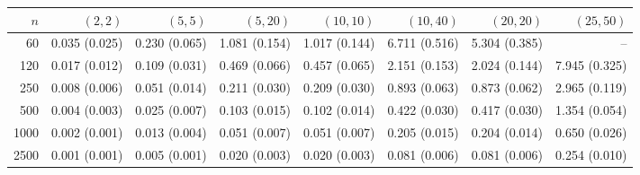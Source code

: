 \begin{tabular}{rrrrrrrr}
\toprule
$n$ & $(2,2)$ & $(5,5)$ & $(5,20)$ & $(10,10)$ & $(10,40)$ & $(20,20)$ & $(25,50)$\\
\midrule
60 & 0.035 \scriptsize(0.025) & 0.230 \scriptsize(0.065) & 1.081 \scriptsize(0.154) & 1.017 \scriptsize(0.144) & 6.711 \scriptsize(0.516) & 5.304 \scriptsize(0.385) & --\\
120 & 0.017 \scriptsize(0.012) & 0.109 \scriptsize(0.031) & 0.469 \scriptsize(0.066) & 0.457 \scriptsize(0.065) & 2.151 \scriptsize(0.153) & 2.024 \scriptsize(0.144) & 7.945 \scriptsize(0.325)\\
250 & 0.008 \scriptsize(0.006) & 0.051 \scriptsize(0.014) & 0.211 \scriptsize(0.030) & 0.209 \scriptsize(0.030) & 0.893 \scriptsize(0.063) & 0.873 \scriptsize(0.062) & 2.965 \scriptsize(0.119)\\
500 & 0.004 \scriptsize(0.003) & 0.025 \scriptsize(0.007) & 0.103 \scriptsize(0.015) & 0.102 \scriptsize(0.014) & 0.422 \scriptsize(0.030) & 0.417 \scriptsize(0.030) & 1.354 \scriptsize(0.054)\\
1000 & 0.002 \scriptsize(0.001) & 0.013 \scriptsize(0.004) & 0.051 \scriptsize(0.007) & 0.051 \scriptsize(0.007) & 0.205 \scriptsize(0.015) & 0.204 \scriptsize(0.014) & 0.650 \scriptsize(0.026)\\
2500 & 0.001 \scriptsize(0.001) & 0.005 \scriptsize(0.001) & 0.020 \scriptsize(0.003) & 0.020 \scriptsize(0.003) & 0.081 \scriptsize(0.006) & 0.081 \scriptsize(0.006) & 0.254 \scriptsize(0.010)\\
\bottomrule
\end{tabular}
